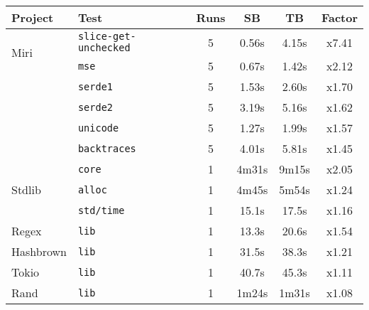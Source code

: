 \documentclass[a4paper,11pt]{article}
\theoremstyle{plain}
\theoremstyle{definition}
\theoremstyle{remark}
\begin{document}
\begin{tabular}{|l|l|c|c|c|c|}
    \hline
    Project & Test & Runs & SB & TB & Factor \\
    \hline
    \multirow{2}{9em}{Miri}
        & \texttt{slice-get-unchecked} & 5 & 0.56s & 4.15s & {\color{Red}x7.41} \\
        & \texttt{mse} & 5 & 0.67s & 1.42s & {\color{Red}x2.12} \\
        & \texttt{serde1} & 5 & 1.53s & 2.60s & {\color{YellowOrange}x1.70} \\
        & \texttt{serde2} & 5 & 3.19s & 5.16s & {\color{YellowOrange}x1.62} \\
        & \texttt{unicode} & 5 & 1.27s & 1.99s & {\color{YellowOrange}x1.57} \\
        & \texttt{backtraces} & 5 & 4.01s & 5.81s & {\color{YellowOrange}x1.45} \\
    \hline
    \multirow{3}{9em}{Stdlib}
        & \texttt{core} & 1 & 4m31s & 9m15s & {\color{Red}x2.05} \\
        & \texttt{alloc} & 1 & 4m45s & 5m54s & {\color{LimeGreen}x1.24} \\
        & \texttt{std/time} & 1 & 15.1s & 17.5s & {\color{LimeGreen}x1.16} \\
    \hline
    \multirow{1}{9em}{Regex}
        & \texttt{lib} & 1 & 13.3s & 20.6s & {\color{YellowOrange}x1.54} \\
    \multirow{1}{9em}{Hashbrown}
        & \texttt{lib} & 1 & 31.5s & 38.3s & {\color{LimeGreen}x1.21} \\
    \multirow{1}{9em}{Tokio}
        & \texttt{lib} & 1 & 40.7s & 45.3s & {\color{LimeGreen}x1.11} \\
    \multirow{1}{9em}{Rand}
        & \texttt{lib} & 1 & 1m24s & 1m31s & {\color{LimeGreen}x1.08} \\
    \hline
\end{tabular}
\end{document}
